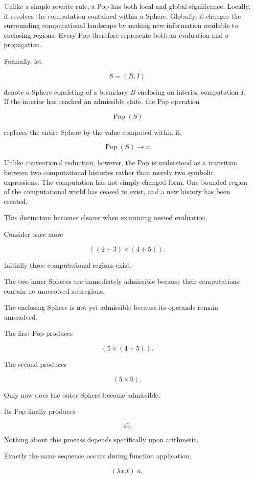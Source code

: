 \documentclass[12pt,oneside]{article}
\theoremstyle{definition}
\theoremstyle{remark}
\begin{document}
Unlike a simple rewrite rule, a Pop has both local and global significance.
Locally, it resolves the computation contained within a Sphere. Globally, it
changes the surrounding computational landscape by making new information
available to enclosing regions. Every Pop therefore represents both an
evaluation and a propagation.

Formally, let

\[
S=(B,I)
\]

denote a Sphere consisting of a boundary \(B\) enclosing an interior
computation \(I\). If the interior has reached an admissible state, the Pop
operation

\[
\operatorname{Pop}(S)
\]

replaces the entire Sphere by the value computed within it,

\[
\operatorname{Pop}(S)
\longrightarrow
v.
\]

Unlike conventional reduction, however, the Pop is understood as a transition
between two computational histories rather than merely two symbolic
expressions. The computation has not simply changed form. One bounded region of
the computational world has ceased to exist, and a new history has been
created.

This distinction becomes clearer when examining nested evaluation.

Consider once more

\[
((2+3)\times(4+5)).
\]

Initially three computational regions exist.

The two inner Spheres are immediately admissible because their computations
contain no unresolved subregions.

The enclosing Sphere is not yet admissible because its operands remain
unresolved.

The first Pop produces

\[
(5\times(4+5)).
\]

The second produces

\[
(5\times9).
\]

Only now does the outer Sphere become admissible.

Its Pop finally produces

\[
45.
\]

Nothing about this process depends specifically upon arithmetic.

Exactly the same sequence occurs during function application,

\[
(\lambda x.t)\;u,
\]
\end{document}
